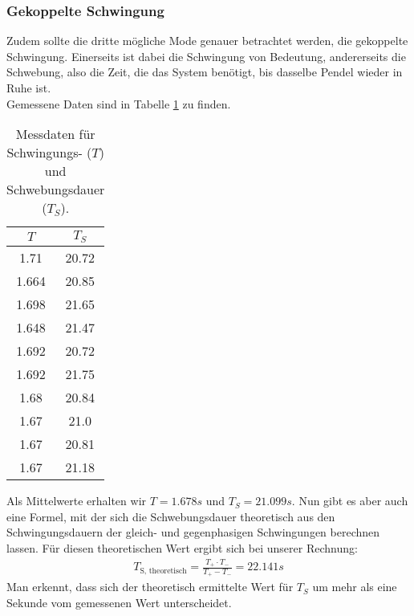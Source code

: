 \subsubsection{Gekoppelte Schwingung}
Zudem sollte die dritte mögliche Mode genauer betrachtet werden, die gekoppelte Schwingung. Einerseits ist dabei die Schwingung von Bedeutung, andererseits die
Schwebung, also die Zeit, die das System benötigt, bis dasselbe Pendel wieder in Ruhe ist. \\
Gemessene Daten sind in Tabelle \ref{tab:gek1} zu finden.
\begin{table}
    \centering
    \caption{Messdaten für Schwingungs- ($T$) und Schwebungsdauer ($T_{S}$).}
    \label{tab:gek1}
    \begin{tabular}{c c}
     \toprule
     $T$ & $T_{S}$\\
     \midrule
     1.71 & 20.72 \\
     1.664 & 20.85\\
     1.698 & 21.65\\
     1.648 & 21.47\\
     1.692 & 20.72\\
     1.692 & 21.75\\
     1.68 & 20.84\\
     1.67 & 21.0 \\
     1.67 & 20.81\\
     1.67 & 21.18\\
     \bottomrule
    \end{tabular}
\end{table}
Als Mittelwerte erhalten wir $T = 1.678s$ und $T_{S} = 21.099s$. Nun gibt es aber auch eine Formel, mit der sich die Schwebungsdauer theoretisch aus den Schwingungsdauern der
gleich- und gegenphasigen Schwingungen berechnen lassen. Für diesen theoretischen Wert ergibt sich bei unserer Rechnung:
\begin{align}
T_\text{S, theoretisch} = \frac{T_{+} \cdot T_{-}}{T_{+} - T_{-}}
    = 22.141s
\end{align}
Man erkennt, dass sich der theoretisch ermittelte Wert für $T_{S}$ um mehr als eine Sekunde vom gemessenen Wert unterscheidet. 

